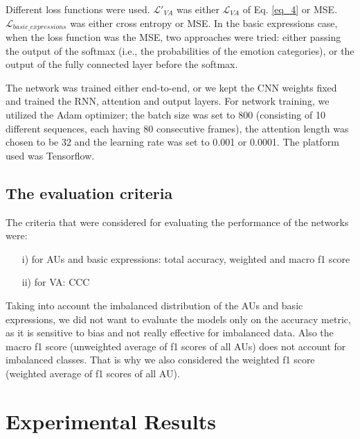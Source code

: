 \documentclass[a4paper, 10pt, conference]{ieeeconf}      %
\begin{document}
Different loss functions were used. $\mathcal{L'}_{VA}$ was either $\mathcal{L}_{VA}$ of Eq. \ref{eq_4} or MSE. $\mathcal{L}_{basic\_expressions}$ was either cross entropy or MSE. In the basic expressions case, when the loss function was the MSE, two approaches were tried: either passing the output of the softmax (i.e., the probabilities of the emotion categories), or the output of the fully connected layer before the softmax.



The network was trained either end-to-end, or we kept the CNN weights fixed and trained the RNN, attention and output layers.
For network training, we utilized the Adam optimizer; the batch size was set to 800 (consisting of 10 different sequences, each having 80 consecutive frames), the attention length was chosen to be 32 and the learning rate was set to 0.001 or 0.0001.
The platform used was Tensorflow.






\subsection{The evaluation criteria}\label{criteria}


The criteria that were considered for evaluating the performance of the networks were:
\begin{itemize}
    \item[i)] for AUs and basic expressions: total accuracy, weighted and macro f1 score 
    \item[ii)] for VA: CCC
\end{itemize}
Taking into account the imbalanced distribution of the AUs and basic expressions, we did not want to evaluate the models only on the accuracy metric, as it is sensitive to bias and not really effective for imbalanced data. Also the macro f1 score (unweighted average of f1 scores of all AUs) does not account for imbalanced classes. That is why we also considered the weighted f1 score (weighted average of f1 scores of all AU).

\section{Experimental Results}\label{experiments}
\end{document}
